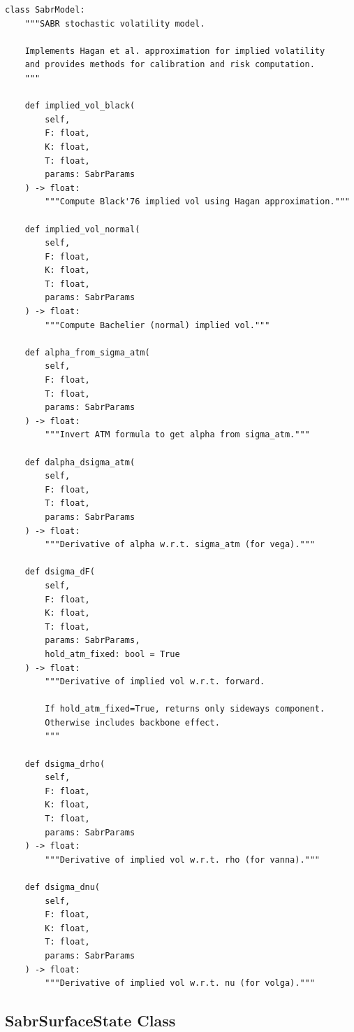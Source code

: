 \documentclass[12pt,a4paper]{report}
\begin{document}
\begin{lstlisting}
class SabrModel:
    """SABR stochastic volatility model.
    
    Implements Hagan et al. approximation for implied volatility
    and provides methods for calibration and risk computation.
    """
    
    def implied_vol_black(
        self,
        F: float,
        K: float,
        T: float,
        params: SabrParams
    ) -> float:
        """Compute Black'76 implied vol using Hagan approximation."""
    
    def implied_vol_normal(
        self,
        F: float,
        K: float,
        T: float,
        params: SabrParams
    ) -> float:
        """Compute Bachelier (normal) implied vol."""
    
    def alpha_from_sigma_atm(
        self,
        F: float,
        T: float,
        params: SabrParams
    ) -> float:
        """Invert ATM formula to get alpha from sigma_atm."""
    
    def dalpha_dsigma_atm(
        self,
        F: float,
        T: float,
        params: SabrParams
    ) -> float:
        """Derivative of alpha w.r.t. sigma_atm (for vega)."""
    
    def dsigma_dF(
        self,
        F: float,
        K: float,
        T: float,
        params: SabrParams,
        hold_atm_fixed: bool = True
    ) -> float:
        """Derivative of implied vol w.r.t. forward.
        
        If hold_atm_fixed=True, returns only sideways component.
        Otherwise includes backbone effect.
        """
    
    def dsigma_drho(
        self,
        F: float,
        K: float,
        T: float,
        params: SabrParams
    ) -> float:
        """Derivative of implied vol w.r.t. rho (for vanna)."""
    
    def dsigma_dnu(
        self,
        F: float,
        K: float,
        T: float,
        params: SabrParams
    ) -> float:
        """Derivative of implied vol w.r.t. nu (for volga)."""
\end{lstlisting}

\subsection{SabrSurfaceState Class}
\end{document}
